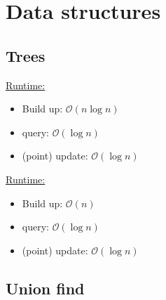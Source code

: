 \section{Data structures}

\subsection{Trees}

\underline{Runtime:}
\begin{itemize}
\item Build up: $\mathcal{O}(n\log n)$
\item query: $\mathcal{O}(\log n)$
\item (point) update: $\mathcal{O}(\log n)$
\end{itemize}



\underline{Runtime:}
\begin{itemize}
\item Build up: $\mathcal{O}(n)$
\item query: $\mathcal{O}(\log n)$
\item (point) update: $\mathcal{O}(\log n)$
\end{itemize}


\subsection{Union find}



